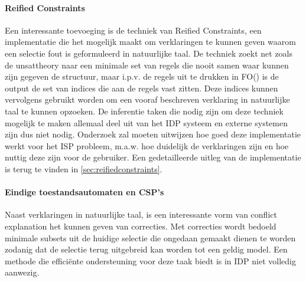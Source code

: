 \paragraph{Reified Constraints}
Een interessante toevoeging is de techniek van Reified Constraints, een implementatie die het mogelijk maakt om verklaringen te kunnen geven waarom een selectie fout is geformuleerd in natuurlijke taal. De techniek zoekt net zoals de unsattheory naar een minimale set van regels die nooit samen waar kunnen zijn gegeven de structuur, maar i.p.v. de regels uit te drukken in FO(\textperiodcentered) is de output de set van indices die aan de regels vast zitten. Deze indices kunnen vervolgens gebruikt worden om een vooraf beschreven verklaring in natuurlijke taal te kunnen opzoeken. De inferentie taken die nodig zijn om deze techniek mogelijk te maken allemaal deel uit van het IDP systeem en externe systemen zijn dus niet nodig. Onderzoek zal moeten uitwijzen hoe goed deze implementatie werkt voor het ISP probleem, m.a.w. hoe duidelijk de verklaringen zijn en hoe nuttig deze zijn voor de gebruiker. Een gedetailleerde uitleg van de implementatie is terug te vinden in \ref{sec:reifiedconstraints}.

\paragraph{Eindige toestandsautomaten en CSP's}
Naast verklaringen in natuurlijke taal, is een interessante vorm van conflict explanation het kunnen geven van correcties. Met correcties wordt bedoeld minimale subsets uit de huidige selectie die ongedaan gemaakt dienen te worden zodanig dat de selectie terug uitgebreid kan worden tot een geldig model. Een methode die effici\"{e}nte ondersteuning voor deze taak biedt is in IDP niet volledig aanwezig. 

